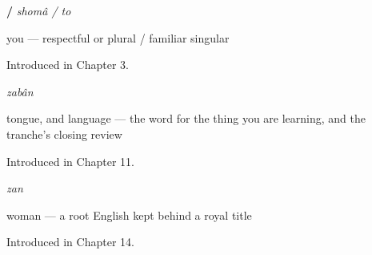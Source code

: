 \noindent\begin{minipage}[t]{\linewidth}
\raggedright
\textbf{ / }\enspace\emph{shomâ / to}\par
\small you — respectful or plural / familiar singular\par
\footnotesize Introduced in Chapter 3.
\end{minipage}\par\medskip

\noindent\begin{minipage}[t]{\linewidth}
\raggedright
\textbf{}\enspace\emph{zabân}\par
\small tongue, and language — the word for the thing you are learning, and the tranche's closing review\par
\footnotesize Introduced in Chapter 11.
\end{minipage}\par\medskip

\noindent\begin{minipage}[t]{\linewidth}
\raggedright
\textbf{}\enspace\emph{zan}\par
\small woman — a root English kept behind a royal title\par
\footnotesize Introduced in Chapter 14.
\end{minipage}\par\medskip
